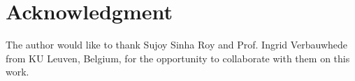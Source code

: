 \documentclass[conference]{IEEEtran}
\begin{document}



\section*{Acknowledgment}


The author would like to thank Sujoy Sinha Roy and Prof. Ingrid Verbauwhede from KU Leuven, Belgium, for the opportunity to collaborate with them on this work.



\end{document}
